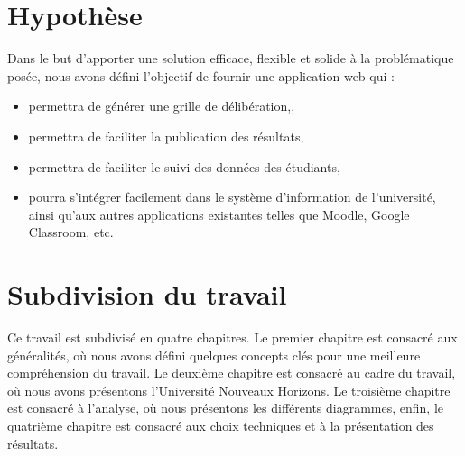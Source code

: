 \section{Hypothèse}
Dans le but d'apporter une solution efficace, flexible et solide à la problématique posée, nous avons défini l'objectif de fournir une application web qui :
\begin{itemize}
    \item permettra de générer une grille de délibération,,
    \item permettra de faciliter la publication des résultats,
    \item permettra de faciliter le suivi des données des étudiants,
    \item pourra s'intégrer facilement dans le système d'information de l'université, ainsi qu'aux autres applications existantes telles que Moodle, Google Classroom, etc.
\end{itemize}

\section{Subdivision du travail}\label{sec:subdivision-du-travail}
Ce travail est subdivisé en quatre chapitres.
Le premier chapitre est consacré aux généralités,
où nous avons défini quelques concepts clés pour
une meilleure compréhension du travail. Le deuxième
chapitre est consacré au cadre du travail, où nous avons
présentons l'Université Nouveaux Horizons. Le troisième chapitre est consacré à
l'analyse, où nous présentons les différents diagrammes, enfin, le quatrième chapitre est
consacré aux choix techniques et à la présentation des résultats.